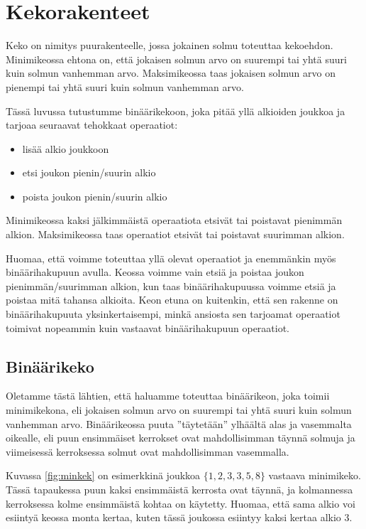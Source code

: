 \chapter{Kekorakenteet}

Keko on nimitys puurakenteelle, jossa jokainen solmu toteuttaa kekoehdon.
Minimikeossa ehtona on, että jokaisen solmun arvo on suurempi tai yhtä suuri
kuin solmun vanhemman arvo.
Maksimikeossa taas jokaisen solmun arvo on pienempi
tai yhtä suuri kuin solmun vanhemman arvo.

Tässä luvussa tutustumme binäärikekoon,
joka pitää yllä alkioiden joukkoa ja tarjoaa seuraavat tehokkaat operaatiot:

\begin{itemize}
\item lisää alkio joukkoon
\item etsi joukon pienin/suurin alkio
\item poista joukon pienin/suurin alkio
\end{itemize}

Minimikeossa kaksi jälkimmäistä operaatiota etsivät tai poistavat pienimmän alkion.
Maksimikeossa taas operaatiot etsivät tai poistavat suurimman alkion.

Huomaa, että voimme toteuttaa yllä olevat operaatiot ja enemmänkin
myös binäärihakupuun avulla.
Keossa voimme vain etsiä ja poistaa joukon pienimmän/suurimman alkion,
kun taas binäärihakupuussa voimme etsiä ja poistaa mitä tahansa alkioita.
Keon etuna on kuitenkin, että sen rakenne on binäärihakupuuta
yksinkertaisempi, minkä ansiosta sen tarjoamat operaatiot toimivat
nopeammin kuin vastaavat binäärihakupuun operaatiot.

\section{Binäärikeko}

Oletamme tästä lähtien, että haluamme toteuttaa binäärikeon,
joka toimii minimikekona, eli jokaisen solmun arvo on suurempi
tai yhtä suuri kuin solmun vanhemman arvo.
Binäärikeossa puuta ''täytetään'' ylhäältä alas ja vasemmalta oikealle,
eli puun ensimmäiset kerrokset ovat mahdollisimman täynnä solmuja
ja viimeisessä kerroksessa solmut ovat mahdollisimman vasemmalla.

Kuvassa \ref{fig:minkek} on esimerkkinä joukkoa $\{1,2,3,3,5,8\}$
vastaava minimikeko.
Tässä tapaukessa puun kaksi ensimmäistä kerrosta ovat täynnä,
ja kolmannessa kerroksessa kolme ensimmäistä kohtaa on käytetty.
Huomaa, että sama alkio voi esiintyä keossa monta kertaa,
kuten tässä joukossa esiintyy kaksi kertaa alkio 3.

